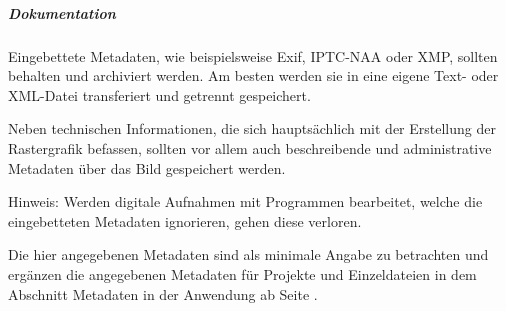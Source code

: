 \subparagraph{Dokumentation}
\label{Metadaten-Rastergrafiken} Eingebettete Metadaten, wie beispielsweise Exif, IPTC-NAA oder XMP, sollten behalten und archiviert werden. Am besten werden sie in eine eigene Text- oder XML-Datei transferiert und getrennt gespeichert.

Neben technischen Informationen, die sich hauptsächlich mit der Erstellung der Rastergrafik befassen, sollten vor allem auch beschreibende und administrative Metadaten über das Bild gespeichert werden.

Hinweis: Werden digitale Aufnahmen mit Programmen bearbeitet, welche die eingebetteten Metadaten ignorieren, gehen diese verloren. 

Die hier angegebenen Metadaten sind als minimale Angabe zu betrachten und ergänzen die angegebenen Metadaten für Projekte und Einzeldateien in dem Abschnitt Metadaten in der Anwendung ab Seite \pageref{Metadaten-anwendung}.

